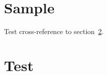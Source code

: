 \documentclass[a4paper]{article}
\begin{document}
\section{Sample}
Test cross-reference to section~\ref{sec:test}.
\section{Test}
\label{sec:test}
\end{document}
